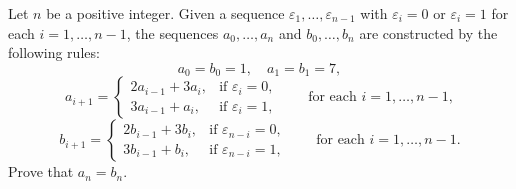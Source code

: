Let $n$ be a positive integer. Given a sequence $\varepsilon_1, \ldots, \varepsilon_{n-1}$ with $\varepsilon_i = 0$ or $\varepsilon_i = 1$ for each $i = 1, \ldots, n-1$, the sequences $a_0, \ldots, a_n$ and $b_0, \ldots, b_n$ are constructed by the following rules:
\[
a_0 = b_0 = 1, \quad a_1 = b_1 = 7,
\]
\[
a_{i+1} = \begin{cases} 2a_{i-1} + 3a_i, & \text{if } \varepsilon_i = 0, \\ 3a_{i-1} + a_i, & \text{if } \varepsilon_i = 1, \end{cases} \qquad \text{for each } i = 1, \ldots, n-1,
\]
\[
b_{i+1} = \begin{cases} 2b_{i-1} + 3b_i, & \text{if } \varepsilon_{n-i} = 0, \\ 3b_{i-1} + b_i, & \text{if } \varepsilon_{n-i} = 1, \end{cases} \qquad \text{for each } i = 1, \ldots, n-1.
\]
Prove that $a_n = b_n$.
